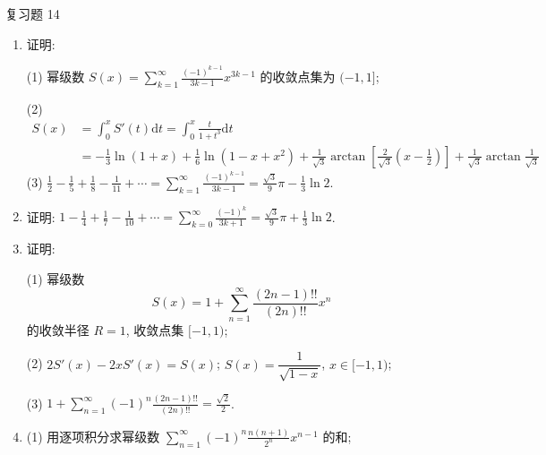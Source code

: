 \begin{exblock}{复习题 14}
\begin{enumerate}
  (1) $\sum_{n=1}^{\infty}f_{n}(x)$ 在 $[0,1]$ 上绝对一致收敛;

  (2) 记 $\varphi(x)=\sum_{n=1}^{\infty}f_{n}(x)$, 则
  \[
    \varphi'(x)+\varphi(x)+f(x)=0.
\]
  从而, $\sum_{n=1}^{\infty}f_{n}(x)$ 在 $[0,1]$ 上一致收敛于 $\varphi(x)=\int_{x}^{1}\mathrm{e}^{y-x}f(y)\mathrm{d}y$;

  (3) 将 $\varphi(x)=u(x)\mathrm{e}^{-x}$ 代入 $\varphi'(x)+\varphi(x)+f(x)=0$, 则得
  \[
    u(x)=\int_{x}^{1}f(y)\mathrm{e}^{y}\mathrm{d}y,\quad\varphi(x)=\int_{x}^{1}f(y)\mathrm{e}^{y-x}\mathrm{d}y.
\]
  \item 证明:

  (1) 幂级数 $S(x)=\displaystyle\sum_{k=1}^{\infty}\frac{(-1)^{k-1}}{3k-1}x^{3k-1}$ 的收敛点集为 $(-1,1]$;

  (2)
  \[
    \begin{aligned}
      S(x)&=\int_{0}^{x}S'(t)\mathrm{d}t=\int_{0}^{x}\frac{t}{1+t^{3}}\mathrm{d}t\\
      &=-\frac{1}{3}\ln(1+x)+\frac{1}{6}\ln(1-x+x^{2})+\frac{1}{\sqrt{3}}\arctan\left[\frac{2}{\sqrt{3}}\left(x-\frac{1}{2}\right)\right]+\frac{1}{\sqrt{3}}\arctan\frac{1}{\sqrt{3}}
    \end{aligned}
\]
  (3) $\displaystyle\frac{1}{2}-\frac{1}{5}+\frac{1}{8}-\frac{1}{11}+\cdots=\sum_{k=1}^{\infty}\frac{(-1)^{k-1}}{3k-1}=\frac{\sqrt{3}}{9}\pi-\frac{1}{3}\ln2$.
  \item 证明: $\displaystyle1-\frac{1}{4}+\frac{1}{7}-\frac{1}{10}+\cdots=\sum_{k=0}^{\infty}\frac{(-1)^{k}}{3k+1}=\frac{\sqrt{3}}{9}\pi+\frac{1}{3}\ln2$.
  \item 证明:

  (1) 幂级数
  \[
    S(x)=1+\sum_{n=1}^{\infty}\frac{(2n-1)!!}{(2n)!!}x^{n}
\]
  的收敛半径 $R=1$, 收敛点集 $[-1,1)$;

  (2) $2S'(x)-2xS'(x)=S(x)$; $S(x)=\dfrac{1}{\sqrt{1-x}}$, $x\in[-1,1)$;

  (3) $\displaystyle1+\sum_{n=1}^{\infty}(-1)^{n}\frac{(2n-1)!!}{(2n)!!}=\frac{\sqrt{2}}{2}$.
  \item (1) 用逐项积分求幂级数 $\displaystyle\sum_{n=1}^{\infty}(-1)^{n}\frac{n(n+1)}{2^{n}}x^{n-1}$ 的和;


\end{enumerate}
\end{exblock}
